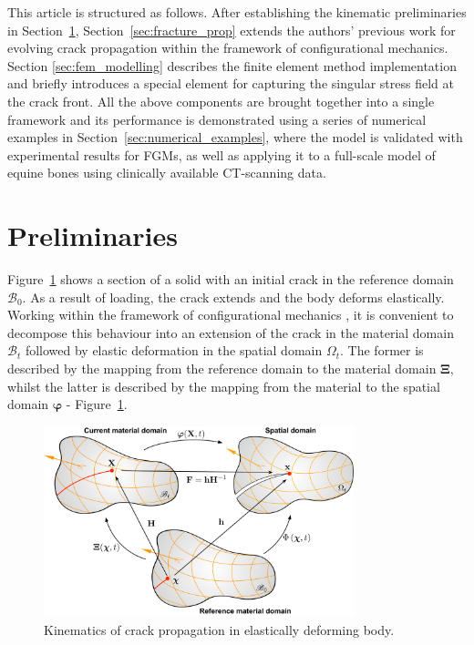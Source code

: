 \documentclass[onecolumn]{svjour3}
\begin{document}
This article is structured as follows. After establishing the kinematic preliminaries in Section~\ref{preliminaries}, Section~\ref{sec:fracture_prop} extends the authors' previous work for evolving crack propagation within the framework of configurational mechanics. Section \ref{sec:fem_modelling} describes the finite element method implementation and briefly introduces a special element for capturing the singular stress field at the crack front.  
All the above components are brought together into a single framework and its performance is demonstrated using a series of numerical examples in Section~\ref{sec:numerical_examples}, where the model is validated with experimental results for 
FGMs, as well as applying it to a full-scale model of equine bones using clinically available CT-scanning data.


% 
% 
\section{Preliminaries}
\label{preliminaries}
Figure~\ref{fig:domains4} shows a section of a solid with an initial crack in the reference domain $\mathscr{B}_{0}$. As a result of loading, the crack extends and the body deforms elastically. Working within the framework of configurational mechanics \cite{kaczmarczyk2014three,kienzler2014configurational}, it is convenient to decompose this behaviour into an extension of the crack in the material domain  $\mathscr{B}_t$ followed by elastic deformation in the spatial domain $\Omega_t$. The former is described by the mapping from the reference  domain to the material domain ${\boldsymbol\Xi}$, whilst the latter is described by the mapping from the material to the spatial domain ${\boldsymbol\varphi}$ - Figure~\ref{fig:domains4}.

\begin{figure}[th] 
\setlength{\fboxsep}{0pt}%
\setlength{\fboxrule}{0pt}%
\begin{center}
\includegraphics[width=9cm]{Figures/domains5.pdf} 
\end{center}
\caption{Kinematics of crack propagation in elastically deforming body.}
\label{fig:domains4}
\end{figure}
\end{document}

